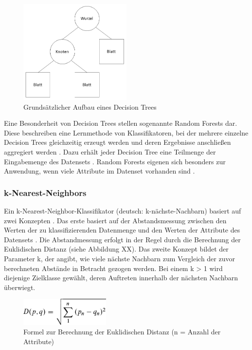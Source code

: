 \begin{figure}[]
    \centering
    \includegraphics[width=0.5\textwidth]{images/DT}
    \caption{Grundsätzlicher Aufbau eines Decision Trees\label{fig:dt}}
\end{figure}

Eine Besonderheit von Decision Trees stellen sogenannte Random Forests dar. Diese beschreiben eine Lernmethode von Klassifikatoren, bei der mehrere einzelne Decision Trees gleichzeitig erzeugt werden und deren Ergebnisse anschließen aggregiert werden \cite{Alam2013}. Dazu erhält jeder Decision Tree eine Teilmenge der Eingabemenge des Datensets \cite{Alam2013}. Random Forests eigenen sich besonders zur Anwendung, wenn viele Attribute im Datenset vorhanden sind \cite{Alam2013}.

\subsubsection*{k-Nearest-Neighbors}
Ein k-Nearest-Neighbor-Klassifikator (deutsch: k-nächste-Nachbarn) basiert auf zwei Konzepten \cite{Zhang2016}. Das erste basiert auf der Abstandsmessung zwischen den Werten der zu klassifizierenden Datenmenge und den Werten der Attribute des Datensets \cite{Zhang2016}. Die Abstandmessung erfolgt in der Regel durch die Berechnung der Euklidischen Distanz (siehe Abbildung XX). Das zweite Konzept bildet der Parameter k, der angibt, wie viele nächste Nachbarn zum Vergleich der zuvor berechneten Abstände in Betracht gezogen werden. Bei einem k > 1 wird diejenige Zielklasse gewählt, deren Auftreten innerhalb der nächsten Nachbarn überwiegt.

\begin{figure}[]
    \centering
    \includegraphics[width=0.4\textwidth]{images/EUKLID}
    \caption{Formel zur Berechnung der Euklidischen Distanz (n = Anzahl der Attribute)\label{fig:euklid}}
\end{figure}

